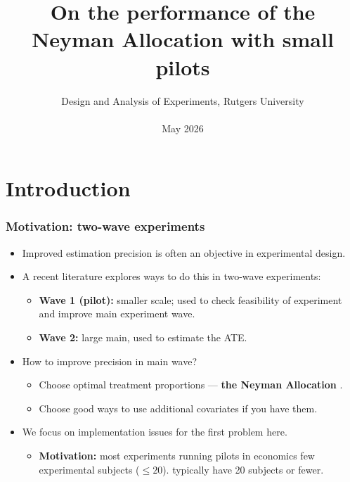 \documentclass[aspectratio=169, 10pt]{beamer}
\title{On the performance of the Neyman Allocation with small pilots}
\author{%
  \texorpdfstring{%
    \begin{columns}
      \column{.5\linewidth}
      \centering
      Yong Cai \\ University of Wisconsin
      \column{.5\linewidth}
      \centering
      Ahnaf Rafi \\ University of Virginia
    \end{columns}
 }
 {Yong Cai (UW-Madison), Ahnaf Rafi (UVA)}
}
\date{%
Design and Analysis of Experiments, Rutgers University \\
\hfill \\
May 2026}
\theoremstyle{definition}
\theoremstyle{plain}
\begin{document}
\begin{frame}
\titlepage
\end{frame}

\section*{Introduction}

\begin{frame}
\frametitle{Motivation: two-wave experiments}
\begin{itemize}
  \item Improved estimation precision is often an objective in experimental
    design.
    \vfill
  \item A recent literature explores ways to do this in two-wave experiments:
    \vfill
    \begin{itemize}
      \item \textbf{Wave 1 (pilot):} smaller scale; used to check feasibility of
        experiment and improve main experiment wave.
        \vfill
      \item \textbf{Wave 2:} large main, used to estimate the ATE.
    \end{itemize}
    \vfill
  \item How to improve precision in main wave?
    \vfill
    \begin{itemize}
      \item Choose optimal treatment proportions ---
        \textbf{the Neyman Allocation} \citep{1934neymanTwoDifferentAspects}.
        \vfill
      \item Choose good ways to use additional covariates if you have them.
    \end{itemize}
    \vfill
  \item We focus on implementation issues for the first problem here.
    \vfill
    \begin{itemize}
      \item \textbf{Motivation:} most experiments running pilots in economics
        few experimental subjects (\(\leq 20\)).
        typically have 20 subjects or fewer.
    \end{itemize}
\end{itemize}
\end{frame}

\end{document}
